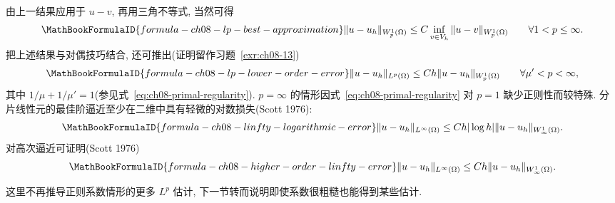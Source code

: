 由上一结果应用于 $u-v$, 再用三角不等式, 当然可得
\begin{equation}
\MathBookFormulaID{formula-ch08-lp-best-approximation}
\label{eq:ch08-lp-best-approximation}
\|u-u_h\|_{W_p^1(\Omega)}\leq C\inf_{v\in V_h}\|u-v\|_{W_p^1(\Omega)}
\qquad\forall1<p\leq\infty.
\end{equation}
把上述结果与对偶技巧结合, 还可推出(证明留作习题~\ref{exr:ch08-13})
\begin{equation}
\MathBookFormulaID{formula-ch08-lp-lower-order-error}
\label{eq:ch08-lp-lower-order-error}
\|u-u_h\|_{L^p(\Omega)}\leq Ch\|u-u_h\|_{W_p^1(\Omega)}
\qquad\forall\mu'<p<\infty,
\end{equation}
其中 $1/\mu+1/\mu'=1$(参见式~\eqref{eq:ch08-primal-regularity}). $p=\infty$ 的情形因式~\eqref{eq:ch08-primal-regularity} 对 $p=1$ 缺少正则性而较特殊. 分片线性元的最佳阶逼近至少在二维中具有轻微的对数损失(Scott 1976):
\[
\MathBookFormulaID{formula-ch08-linfty-logarithmic-error}
\|u-u_h\|_{L^\infty(\Omega)}\leq Ch|\log h|\|u-u_h\|_{W_\infty^1(\Omega)}.
\]
对高次逼近可证明(Scott 1976)
\[
\MathBookFormulaID{formula-ch08-higher-order-linfty-error}
\|u-u_h\|_{L^\infty(\Omega)}\leq Ch\|u-u_h\|_{W_\infty^1(\Omega)}.
\]

这里不再推导正则系数情形的更多 $L^p$ 估计, 下一节转而说明即使系数很粗糙也能得到某些估计.
